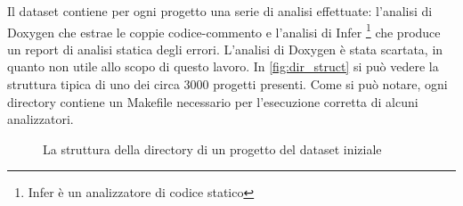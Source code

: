 Il dataset contiene per ogni progetto una serie di analisi effettuate: l'analisi di Doxygen che estrae le coppie codice-commento e l'analisi di Infer \footnote{Infer è un analizzatore di codice statico} che produce un report di analisi statica degli errori.
L'analisi di Doxygen è stata scartata, in quanto non utile allo scopo di questo lavoro. In \autoref{fig:dir_struct} si può vedere la struttura tipica di uno dei circa 3000 progetti presenti.
Come si può notare, ogni directory contiene un Makefile necessario per l'esecuzione corretta di alcuni analizzatori.
\begin{figure}
    \centering
    \caption{La struttura della directory di un progetto del dataset iniziale}
    \label{fig:dir_struct}
\end{figure}




